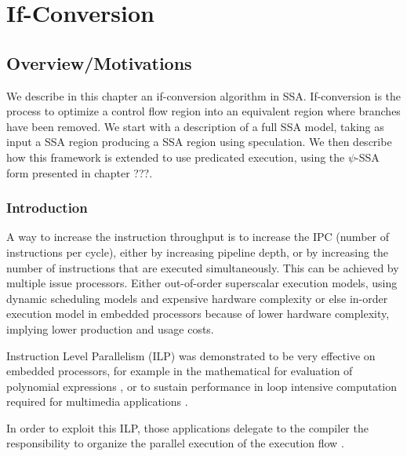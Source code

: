 \chapter{If-Conversion }\label{chap:if-conversion}
\graphicspath{{img/}{if_conversion/img/}{part4/if_conversion/img/}}
	
\newcommand\cond{~?~}


\section{Overview/Motivations}

We describe in this chapter an if-conversion algorithm in SSA. If-conversion is the process to optimize a control flow region into an equivalent region where branches have been removed. We start with a description of a full SSA model, taking as input a SSA region producing a SSA region using speculation. We then describe how this framework is extended to use predicated execution, using the $\psi$-SSA form presented in chapter ???. 

\subsection{Introduction}

A way to increase the instruction throughput is to increase the IPC (number of instructions per cycle), either by increasing pipeline depth, or by increasing the number of instructions that are executed simultaneously. This can be achieved by multiple issue processors. Either out-of-order superscalar execution models, using dynamic scheduling models and expensive hardware complexity or else in-order execution model in embedded processors because of lower hardware complexity, implying lower production and usage costs.

Instruction Level Parallelism (ILP) was demonstrated to be very effective on embedded processors, for example in the mathematical for evaluation of polynomial expressions \cite{Jeannerod:2010:TTI:1837210.1837212}, or to sustain performance in loop intensive computation required for multimedia applications \cite{FisherFaraboshiYoung}.

In order to exploit this ILP, those applications delegate to the compiler the responsibility to organize the parallel execution of the execution flow \cite{Rau:2003:IP:1074100.1074489}.

